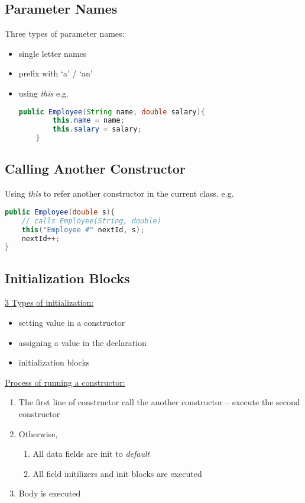 \documentclass[12pt]{article}
\begin{document}
\subsection{Parameter Names}
Three types of parameter names:
\begin{itemize}
    \item single letter names
    \item prefix with `a' / `an'
    \item using \textit{this}\newline
    e.g.
    \begin{lstlisting}[language=Java]
    public Employee(String name, double salary){
        this.name = name;
        this.salary = salary;
    }
    \end{lstlisting}
\end{itemize}

\subsection{Calling Another Constructor}
Using \textit{this} to refer another constructor in the current class.\newline
e.g.
\begin{lstlisting}[language=Java]
public Employee(double s){
    // calls Employee(String, double)
    this("Employee #" nextId, s);
    nextId++;
}
\end{lstlisting}

\subsection{Initialization Blocks}
\underline{3 Types of initialization:}
\begin{itemize}
    \item setting value in a constructor
    \item assigning a value in the declaration
    \item initialization blocks
\end{itemize}

\underline{Process of running a constructor:}
\begin{enumerate}
    \item The first line of constructor call the another constructor -- execute the second constructor
    \item Otherwise,
    \begin{enumerate}
        \item All data fields are init to \emph{default}
        \item All field initilizers and init blocks are executed
    \end{enumerate} 
    \item Body is executed
\end{enumerate}
\end{document}
